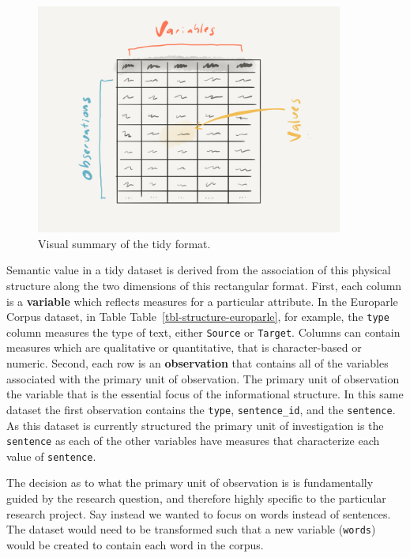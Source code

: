 \documentclass[
  letterpaper,
]{latex/krantz}
\begin{document}
\begin{figure}

{\centering \includegraphics[width=0.9\textwidth,height=\textheight]{./figures/understanding-data/tidy-format-paper.png}

}

\caption{\label{fig-tidy-format-image}Visual summary of the tidy
format.}

\end{figure}

Semantic value in a tidy dataset is derived from the association of this
physical structure along the two dimensions of this rectangular format.
First, each column is a \textbf{variable} which reflects measures for a
particular attribute. In the Europarle Corpus dataset, in Table
Table~\ref{tbl-structure-europarle}, for example, the \texttt{type}
column measures the type of text, either \texttt{Source} or
\texttt{Target}. Columns can contain measures which are qualitative or
quantitative, that is character-based or numeric. Second, each row is an
\textbf{observation} that contains all of the variables associated with
the primary unit of observation. The primary unit of observation the
variable that is the essential focus of the informational structure. In
this same dataset the first observation contains the \texttt{type},
\texttt{sentence\_id}, and the \texttt{sentence}. As this dataset is
currently structured the primary unit of investigation is the
\texttt{sentence} as each of the other variables have measures that
characterize each value of \texttt{sentence}.

The decision as to what the primary unit of observation is is
fundamentally guided by the research question, and therefore highly
specific to the particular research project. Say instead we wanted to
focus on words instead of sentences. The dataset would need to be
transformed such that a new variable (\texttt{words}) would be created
to contain each word in the corpus.
\end{document}
